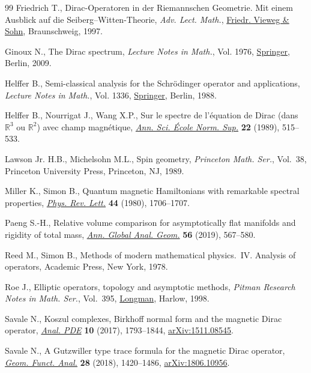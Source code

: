 \documentclass[pdftex]{sigma}
\numberwithin{equation}{section}
\begin{document}
\begin{thebibliography}{99}
Friedrich T., Dirac-{O}peratoren in der {R}iemannschen {G}eometrie. {M}it einem
 {A}usblick auf die {S}eiberg--{W}itten-{T}heorie, \textit{Adv. Lect. Math.}, \href{https://doi.org/10.1007/978-3-322-80302-3}{Friedr.
 Vieweg \& Sohn}, Braunschweig, 1997.

Ginoux N., The {D}irac spectrum, \textit{Lecture Notes in Math.}, Vol. 1976,
 \href{https://doi.org/10.1007/978-3-642-01570-0}{Springer}, Berlin, 2009.

Helffer B., Semi-classical analysis for the {S}chr\"odinger operator and
 applications, \textit{Lecture Notes in Math.}, Vol. 1336, \href{https://doi.org/10.1007/BFb0078115}{Springer}, Berlin,
 1988.

Helffer B., Nourrigat J., Wang X.P., Sur le spectre de l'\'equation de {D}irac
 (dans {${\mathbb R}^3$} ou {${\mathbb R}^2$}) avec champ magn\'etique,
 \href{https://doi.org/10.24033/asens.1591}{\textit{Ann. Sci. \'Ecole Norm. Sup.}} \textbf{22} (1989), 515--533.

Lawson Jr. H.B., Michelsohn M.L., Spin geometry, \textit{Princeton Math. Ser.},
 Vol.~38, Princeton University Press, Princeton, NJ, 1989.

Miller K., Simon B., Quantum magnetic {H}amiltonians with remarkable spectral
 properties, \href{https://doi.org/10.1103/PhysRevLett.44.1706}{\textit{Phys. Rev. Lett.}} \textbf{44} (1980), 1706--1707.

Paeng S.-H., Relative volume comparison for asymptotically flat manifolds and
 rigidity of total mass, \href{https://doi.org/10.1007/s10455-019-09679-4}{\textit{Ann. Global Anal. Geom.}} \textbf{56} (2019),
 567--580.

Reed M., Simon B., Methods of modern mathematical physics.~{IV}. {A}nalysis of
 operators, Academic Press, New York, 1978.

Roe J., Elliptic operators, topology and asymptotic methods, \textit{Pitman
 Research Notes in Math. Ser.}, Vol.~395, \href{https://doi.org/10.1201/b16418}{Longman}, Harlow, 1998.

Savale N., Koszul complexes, {B}irkhoff normal form and the magnetic {D}irac
 operator, \href{https://doi.org/10.2140/apde.2017.10.1793}{\textit{Anal. PDE}} \textbf{10} (2017), 1793--1844,
 \href{https://arxiv.org/abs/1511.08545}{arXiv:1511.08545}.

Savale N., A {G}utzwiller type trace formula for the magnetic {D}irac operator,
 \href{https://doi.org/10.1007/s00039-018-0462-y}{\textit{Geom. Funct. Anal.}} \textbf{28} (2018), 1420--1486,
 \href{https://arxiv.org/abs/1806.10956}{arXiv:1806.10956}.


\end{thebibliography}
\end{document}
